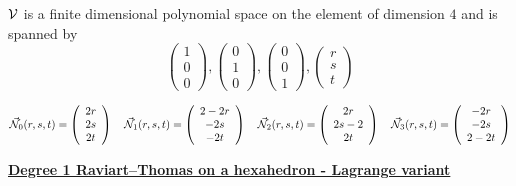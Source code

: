${\cal V}$ is a finite dimensional polynomial space on the element of dimension $4$ and is spanned by 
\[
\left( \begin{array}{c} 1 \\ 0 \\ 0  \end{array} \right),
\left( \begin{array}{c} 0 \\ 1 \\ 0  \end{array} \right),
\left( \begin{array}{c} 0 \\ 0 \\ 1 \end{array} \right),
\left( \begin{array}{c} r \\ s \\ t \end{array} \right)
\]


\[
\vec{{\mathcal{N}}}_0(r,s,t) = \left( \begin{array}{c} 2r \\ 2s \\ 2t  \end{array} \right) 
\quad
\vec{{\mathcal{N}}}_1(r,s,t) = \left( \begin{array}{c} 2-2r \\ -2s \\ -2t  \end{array} \right) 
\quad
\vec{{\mathcal{N}}}_2(r,s,t) = \left( \begin{array}{c} 2r \\ 2s-2 \\ 2t  \end{array} \right) 
\quad
\vec{{\mathcal{N}}}_3(r,s,t) = \left( \begin{array}{c} -2r \\ -2s \\ 2-2t  \end{array} \right) 
\]


\vspace{.5cm}
\noindent
\underline{\bf Degree 1 Raviart–Thomas on a hexahedron - Lagrange variant}


